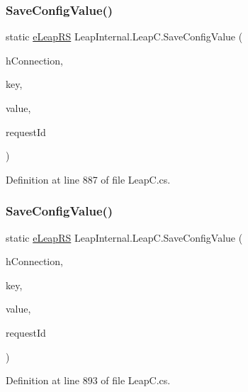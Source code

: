 \subsubsection{\texorpdfstring{SaveConfigValue()}{SaveConfigValue()}\hspace{0.1cm}{\footnotesize\ttfamily [3/4]}}
{\footnotesize\ttfamily static \mbox{\hyperlink{namespace_leap_internal_ae50b07d24c508b84273392b6dcbea1d9}{e\+Leap\+RS}} Leap\+Internal.\+Leap\+C.\+Save\+Config\+Value (\begin{DoxyParamCaption}\item[{Int\+Ptr}]{h\+Connection,  }\item[{string}]{key,  }\item[{float}]{value,  }\item[{out U\+Int32}]{request\+Id }\end{DoxyParamCaption})\hspace{0.3cm}{\ttfamily [static]}}



Definition at line 887 of file Leap\+C.\+cs.

\mbox{\label{class_leap_internal_1_1_leap_c_a339a87259347a44276f4bba6b50e2509}} 
\subsubsection{\texorpdfstring{SaveConfigValue()}{SaveConfigValue()}\hspace{0.1cm}{\footnotesize\ttfamily [4/4]}}
{\footnotesize\ttfamily static \mbox{\hyperlink{namespace_leap_internal_ae50b07d24c508b84273392b6dcbea1d9}{e\+Leap\+RS}} Leap\+Internal.\+Leap\+C.\+Save\+Config\+Value (\begin{DoxyParamCaption}\item[{Int\+Ptr}]{h\+Connection,  }\item[{string}]{key,  }\item[{string}]{value,  }\item[{out U\+Int32}]{request\+Id }\end{DoxyParamCaption})\hspace{0.3cm}{\ttfamily [static]}}



Definition at line 893 of file Leap\+C.\+cs.

\mbox{\label{class_leap_internal_1_1_leap_c_affea4fe6155597b63cde13664955920d}} 
